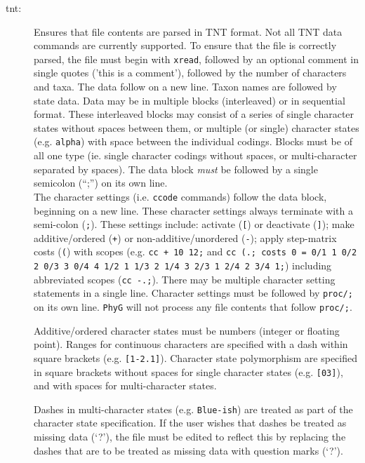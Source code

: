\begin{description}
		\item [tnt:] Ensures that file contents are parsed in TNT \citep{Goloboffetal2008} format. 
		Not all TNT data commands are currently supported. To ensure that the file is correctly
		parsed, the file must begin with \texttt{xread}, followed by an optional comment in single 
		quotes ('this is a comment'), followed by the number of characters and taxa. The data 
		follow on a new line. Taxon names are followed by state data. Data may be in multiple 
		blocks (interleaved) or in sequential format. These interleaved blocks may consist of a 
		series of single character states without spaces between them, or multiple (or single) 
		character states (e.g. \texttt{alpha}) with space between the individual codings. Blocks 
		must be of all one type (ie. single character codings without spaces, or multi-character 
		separated by spaces). The data block \textit{must} be followed by a single semicolon 
		(``;'') 	on its own line.\\
			
		The character settings (i.e. \texttt{ccode} commands) follow the data block, beginning 
		on a 	new line. These character settings always terminate with a semi-colon (\texttt{;}). 
		These settings include: activate (\texttt{[}) or deactivate (\texttt{]}); make additive/ordered 
		(\texttt{+}) 	or non-additive/unordered (\texttt{-}); apply step-matrix costs (\texttt{(}) with 
		scopes (e.g. \texttt{cc + 10 12;} and  \texttt{cc (.; costs 0 = 0/1 1 0/2 2 0/3 3 0/4 4 1/2 1 
		1/3 2 1/4 3 2/3 1 2/4 2 3/4 1;}) including abbreviated scopes (\texttt{cc -.;}). 
		There may 
		be multiple character setting statements in a single line. Character settings must be 
		followed by \texttt{proc/;} on its own line. \texttt{PhyG} will not process
		any file contents that follow \texttt{proc/;}.
		  
		 Additive/ordered character states must be numbers (integer or floating point). Ranges 
		 for continuous characters are specified with a dash within square brackets (e.g. 
		 \texttt{[1-2.1]}). Character state polymorphism are specified in square brackets without 
		 spaces for single character states (e.g. \texttt{[03]}), and with spaces for multi-character 
		 states. %
		  
		 Dashes in multi-character states (e.g. \texttt{Blue-ish}) 
		 are treated as part of the character state specification. If the user wishes that dashes 
		 be treated as missing data (`?'), the file must be edited to reflect this by replacing the 
		 dashes that are to be treated as missing data with question 
		 marks (`?').
		  

\end{description}

